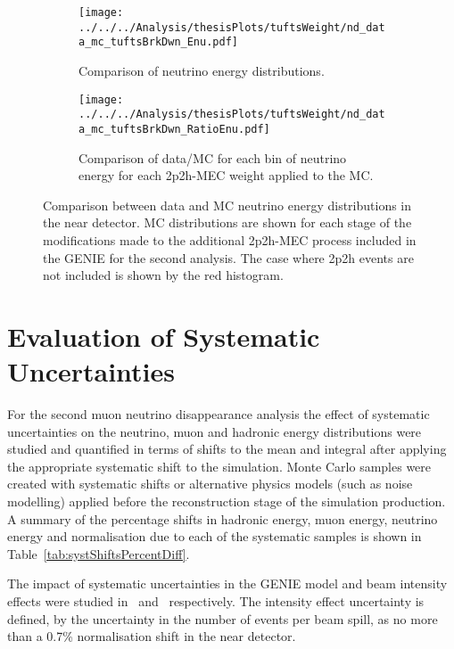 \begin{figure}
\centering
   \begin{subfigure}[b]{0.9\textwidth}
\texttt{[image: ../../../Analysis/thesisPlots/tuftsWeight/nd\_data\_mc\_tuftsBrkDwn\_Enu.pdf]}
   \caption{Comparison of neutrino energy distributions.}
   \label{fig:tuftsWeight_nuE} 
\end{subfigure}
\begin{subfigure}[b]{0.9\textwidth}
\texttt{[image: ../../../Analysis/thesisPlots/tuftsWeight/nd\_data\_mc\_tuftsBrkDwn\_RatioEnu.pdf]}
   \caption{Comparison of data/MC for each bin of neutrino energy for
     each 2p2h-MEC weight applied to the MC.}
   \label{fig:tuftsWeight_nuERatio}
\end{subfigure}
\caption[]{Comparison between data and MC neutrino energy
  distributions in the near detector. MC distributions are shown for
  each stage of the modifications made to the additional 2p2h-MEC
  process included in the GENIE for the second analysis. The case
  where 2p2h events are not included is shown by the red histogram. }
\end{figure}



\section{Evaluation of Systematic Uncertainties}\label{sec:systs}

For the second muon neutrino disappearance analysis the effect of
systematic uncertainties on the neutrino, muon and hadronic energy
distributions were studied and quantified in terms of shifts to the
mean and integral after applying the
appropriate systematic shift to the simulation.
Monte Carlo samples were created with systematic shifts or alternative
physics models (such as noise modelling) applied before the
reconstruction stage of the simulation production.
A summary of the percentage shifts in hadronic energy, muon energy,
neutrino energy and normalisation due to each of the systematic
samples is shown in Table~\ref{tab:systShiftsPercentDiff}. 

The impact of systematic
uncertainties in the GENIE model and beam intensity effects
were studied in~\cite{VladGENIE} and~\cite{BrunoIntensity}
respectively. The intensity effect uncertainty is defined, by the
uncertainty in the number of events per beam spill, as no more than a
0.7\% normalisation shift in the near detector. 


